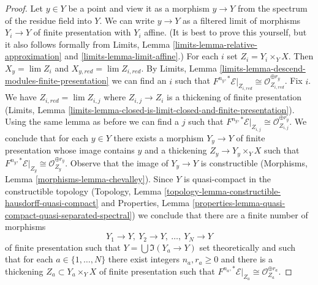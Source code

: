 \begin{proof}
\medskip\noindent
Let $y \in Y$ be a point and view it as a morphism
$y \to Y$ from the spectrum of the residue field into $Y$.
We can write $y \to Y$ as a filtered limit of morphisms $Y_i \to Y$ of
finite presentation with $Y_i$ affine. (It is best to prove this
yourself, but it also follows formally from
Limits, Lemma \ref{limits-lemma-relative-approximation} and
\ref{limits-lemma-limit-affine}.)
For each $i$ set $Z_i = Y_i \times_Y X$. Then $X_y = \lim Z_i$
and $X_{y, red} = \lim Z_{i, red}$.
By Limits, Lemma \ref{limits-lemma-descend-modules-finite-presentation}
we can find an $i$ such that
$F^{n_y, *}\mathcal{E}|_{Z_{i, red}} \cong
\mathcal{O}_{Z_{i, red}}^{\oplus r_y}$.
Fix $i$.
We have $Z_{i, red} = \lim Z_{i, j}$ where $Z_{i, j} \to Z_i$
is a thickening of finite presentation (Limits, Lemma
\ref{limits-lemma-closed-is-limit-closed-and-finite-presentation}).
Using the same lemma as before we can find a $j$ such that
$F^{n_y, *}\mathcal{E}|_{Z_{i, j}} \cong \mathcal{O}_{Z_{i, j}}^{\oplus r_y}$.
We conclude that for each $y \in Y$ there exists a morphism
$Y_y \to Y$ of finite presentation whose image contains $y$
and a thickening $Z_y \to Y_y \times_Y X$ such that
$F^{n_y, *}\mathcal{E}|_{Z_y} \cong \mathcal{O}_{Z_y}^{\oplus r_y}$.
Observe that the image of $Y_y \to Y$ is constructible
(Morphisms, Lemma \ref{morphisms-lemma-chevalley}).
Since $Y$ is quasi-compact in the constructible topology
(Topology, Lemma \ref{topology-lemma-constructible-hausdorff-quasi-compact} and
Properties, Lemma \ref{properties-lemma-quasi-compact-quasi-separated-spectral})
we conclude that there are a finite number of morphisms
$$
Y_1 \to Y,\ Y_2 \to Y,\ \ldots,\ Y_N \to Y
$$
of finite presentation such that $Y = \bigcup \Im(Y_a \to Y)$
set theoretically and such that for each $a \in \{1, \ldots, N\}$
there exist integers $n_a, r_a \geq 0$ and there is a thickening
$Z_a \subset Y_a \times_Y X$ of finite presentation such that
$F^{n_a, *}\mathcal{E}|_{Z_a} \cong \mathcal{O}_{Z_a}^{\oplus r_a}$.


\end{proof}
